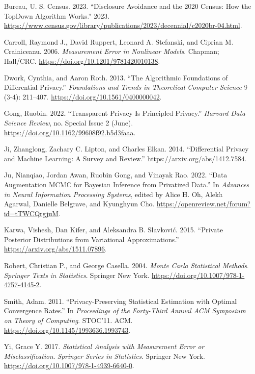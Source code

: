 \hypertarget{refs}{}
\begin{CSLReferences}{1}{0}
\leavevmode{}%
Bureau, U. S. Census. 2023. {``Disclosure Avoidance and the 2020 Census: How the TopDown Algorithm Works.''} 2023. \url{https://www.census.gov/library/publications/2023/decennial/c2020br-04.html}.

\leavevmode{}%
Carroll, Raymond J., David Ruppert, Leonard A. Stefanski, and Ciprian M. Crainiceanu. 2006. \emph{Measurement Error in Nonlinear Models}. Chapman; Hall/CRC. \url{https://doi.org/10.1201/9781420010138}.

\leavevmode{}%
Dwork, Cynthia, and Aaron Roth. 2013. {``The Algorithmic Foundations of Differential Privacy.''} \emph{Foundations and Trends{\textregistered} in Theoretical Computer Science} 9 (3-4): 211--407. \url{https://doi.org/10.1561/0400000042}.

\leavevmode{}%
Gong, Ruobin. 2022. {``Transparent Privacy Is Principled Privacy.''} \emph{Harvard Data Science Review}, no. Special Issue 2 (June). \url{https://doi.org/10.1162/99608f92.b5d3faaa}.

\leavevmode{}%
Ji, Zhanglong, Zachary C. Lipton, and Charles Elkan. 2014. {``Differential Privacy and Machine Learning: A Survey and Review.''} \url{https://arxiv.org/abs/1412.7584}.

\leavevmode{}%
Ju, Nianqiao, Jordan Awan, Ruobin Gong, and Vinayak Rao. 2022. {``Data Augmentation {MCMC} for Bayesian Inference from Privatized Data.''} In \emph{Advances in Neural Information Processing Systems}, edited by Alice H. Oh, Alekh Agarwal, Danielle Belgrave, and Kyunghyun Cho. \url{https://openreview.net/forum?id=tTWCQrgjuM}.

\leavevmode{}%
Karwa, Vishesh, Dan Kifer, and Aleksandra B. Slavković. 2015. {``Private Posterior Distributions from Variational Approximations.''} \url{https://arxiv.org/abs/1511.07896}.

\leavevmode{}%
Robert, Christian P., and George Casella. 2004. \emph{Monte Carlo Statistical Methods}. \emph{Springer Texts in Statistics}. Springer New York. \url{https://doi.org/10.1007/978-1-4757-4145-2}.

\leavevmode{}%
Smith, Adam. 2011. {``Privacy-Preserving Statistical Estimation with Optimal Convergence Rates.''} In \emph{Proceedings of the Forty-Third Annual ACM Symposium on Theory of Computing}. STOC'11. ACM. \url{https://doi.org/10.1145/1993636.1993743}.

\leavevmode{}%
Yi, Grace Y. 2017. \emph{Statistical Analysis with Measurement Error or Misclassification}. \emph{Springer Series in Statistics}. Springer New York. \url{https://doi.org/10.1007/978-1-4939-6640-0}.

\end{CSLReferences}

